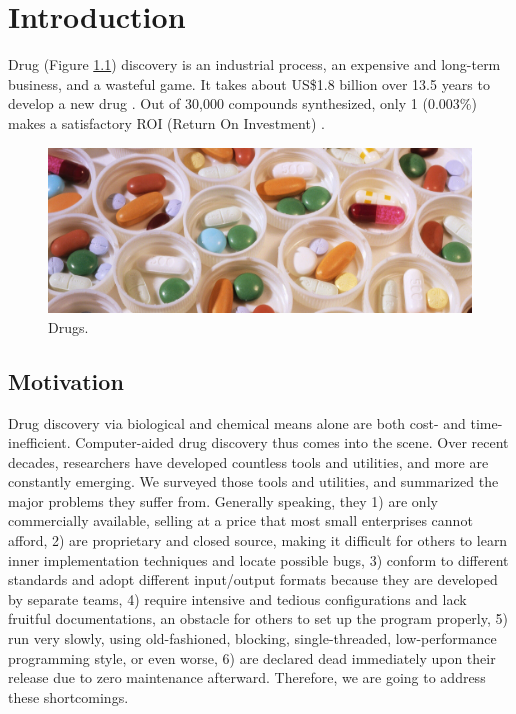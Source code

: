 \chapter{Introduction}

Drug (Figure \ref{Background:Drugs}) discovery is an industrial process, an expensive and long-term business, and a wasteful game. It takes about US\$1.8 billion over 13.5 years to develop a new drug \citep{716}. Out of 30,000 compounds synthesized, only 1 (0.003\%) makes a satisfactory ROI (Return On Investment) \citep{713}.

\begin{figure}
\centering
\includegraphics[width=\textwidth]{Background/Drugs.jpg}
\caption{Drugs.}
\label{Background:Drugs}
\end{figure}

\section{Motivation}

Drug discovery via biological and chemical means alone are both cost- and time-inefficient. Computer-aided drug discovery thus comes into the scene. Over recent decades, researchers have developed countless tools and utilities, and more are constantly emerging. We surveyed those tools and utilities, and summarized the major problems they suffer from. Generally speaking, they 1) are only commercially available, selling at a price that most small enterprises cannot afford, 2) are proprietary and closed source, making it difficult for others to learn inner implementation techniques and locate possible bugs, 3) conform to different standards and adopt different input/output formats because they are developed by separate teams, 4) require intensive and tedious configurations and lack fruitful documentations, an obstacle for others to set up the program properly, 5) run very slowly, using old-fashioned, blocking, single-threaded, low-performance programming style, or even worse, 6) are declared dead immediately upon their release due to zero maintenance afterward. Therefore, we are going to address these shortcomings.

